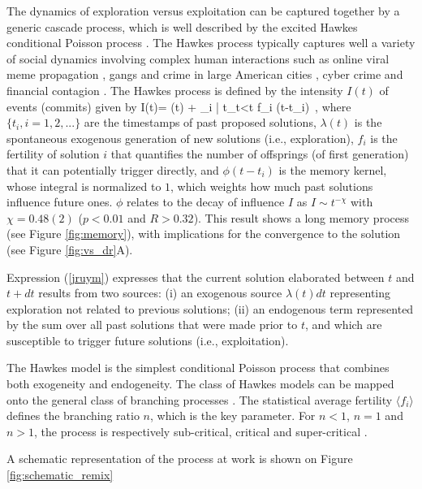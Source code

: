 The dynamics of exploration versus exploitation can be captured together by a generic cascade process, which is well described by the excited  Hawkes conditional Poisson process \cite{hawkes1974acluster}.
The Hawkes process typically captures well a variety of social dynamics involving complex human interactions such as online viral meme propagation \cite{crane2008}, gangs and crime in large American cities \cite{mohler2011}, cyber crime \cite{baldwin2012} and financial contagion \cite{ait-sahalia2010,filiminov2012,filiminov2014}.  
The Hawkes process is defined by the intensity $I(t)$ of events (commits) given by
\be
I(t)= \lambda(t) + \sum_{i | t_t<t}  f_i \phi(t-t_i)~,
\label{jruym}
\ee
where $\{t_i, i=1, 2, ...\}$ are the timestamps of past proposed solutions, $\lambda(t)$ is the spontaneous
exogenous generation of new solutions (i.e., exploration), $f_{i}$ is the 
fertility of solution $i$ that quantifies the number of offsprings (of first generation)
that it can potentially trigger directly, and $ \phi(t-t_i)$ is the memory kernel, whose
integral is normalized to $1$, which weights how 
much past solutions influence future ones. $\phi$ relates to the decay of influence $I$ as $I \sim t^{-\chi}$ with $\chi = 0.48(2)$ ($p < 0.01$ and $R > 0.32$). This result shows a long memory process (see Figure \ref{fig:memory}), with implications for the convergence to the solution (see Figure \ref{fig:vs_dr}A). 


Expression (\ref{jruym}) expresses that the current solution elaborated between $t$ and $t+dt$
results from two sources: (i) an exogenous source $\lambda(t) dt$ representing exploration not related
to previous solutions; (ii) an endogenous term represented by the sum over all past solutions that were 
made prior to $t$, and which are susceptible to trigger future solutions (i.e., exploitation). 

The Hawkes model is the simplest conditional Poisson process that combines both exogeneity and
endogeneity. The class of Hawkes models can be mapped onto the general class of branching processes \cite{daley2007}. 
The statistical average fertility $\langle f_i \rangle$ defines the branching ratio $n$, which is the key
parameter. For $n<1$, $n=1$ and $n>1$, the process is respectively sub-critical, critical and super-critical \cite{helmstetter2002subcritical,helmstetter2003}.

A schematic representation of the process at work is shown on Figure \ref{fig:schematic_remix}

